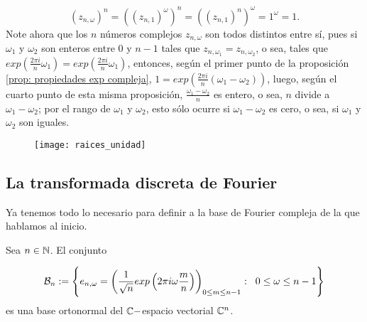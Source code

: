 \[
(z_{n, \omega})^{n} = ((z_{n,1})^{\omega} )^{n} = 
((z_{n,1})^{n} )^{\omega} = 1^{\omega}=1. 
\]
Note ahora que los $n$ números complejos $z_{n, \omega}$ son todos 
distintos entre sí, pues si $\omega_{1}$ y $\omega_{2}$ son enteros
entre $0$ y $n-1$ tales que $z_{n, \omega_{1}} = z_{n, \omega_{2}}$,
o sea, tales que 
$exp \left( \frac{2 \pi i }{n} \omega_{1} \right) = 
exp \left( \frac{2 \pi i }{n} \omega_{1} \right)$, entonces, según el primer
punto de la proposición \ref{prop: propiedades exp compleja},
$1 = exp \left( \frac{2 \pi i }{n} (\omega_{1}-\omega_{2}) \right)$, luego, 
según el cuarto punto de esta misma proposición, $\frac{\omega_{1}-\omega_{2}}{n}$
es entero, o sea, $n$ divide a $\omega_{1}-\omega_{2}$; por el rango de 
$\omega_{1}$ y $\omega_{2}$, esto sólo ocurre si $\omega_{1}-\omega_{2}$ es
cero, o sea, si $\omega_{1}$ y $\omega_{2}$
son iguales.
\QEDB
\vspace{0.2cm}

\begin{figure}[H]
	\centering
	\texttt{[image: raices\_unidad]} 
\end{figure}	


\subsection{La transformada discreta de Fourier}

Ya tenemos todo lo necesario para definir a la base
de Fourier compleja de la que hablamos al inicio.

\begin{prop}
\label{prop: construccion Bn}
Sea $n \in \mathbb{N}$. El conjunto

\begin{equation}
\label{eq2: 8ab}
\mathcal{B}_{n} : = \left\{
e_{n,\omega} = \left(
\frac{1}{\sqrt{n}} exp \left(
2 \pi i \omega \frac{m}{n}
\right)
\right)_{0 \leq m \leq n-1}
: \hspace{0.2cm} 0 \leq \omega \leq n-1
 \right\}
\end{equation}
es una base ortonormal del $\mathbb{C}-$espacio
vectorial $\mathbb{C}^{n}$.
\end{prop}

